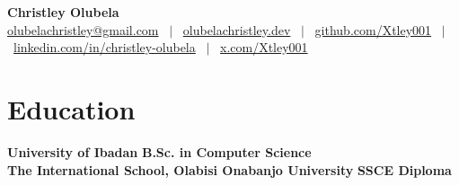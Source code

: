 \documentclass[10pt,a4paper]{article}
\begin{document}
\pagestyle{empty}

\begin{center}
    {\LARGE \textbf{Christley Olubela}} \\[5pt]
    \href{mailto:olubelachristley@gmail.com}{olubelachristley@gmail.com} \ $|$ \ 
    \href{https://www.olubelachristley.dev}{olubelachristley.dev} \ $|$ \ 
    \href{https://github.com/Xtley001}{github.com/Xtley001} \ $|$ \ 
    \href{https://linkedin.com/in/christley-olubela}{linkedin.com/in/christley-olubela} \ $|$ \ 
    \href{https://x.com/Xtley001}{x.com/Xtley001}
\end{center}
\vspace{2pt}

\section{Education}
\textbf{University of Ibadan} \hfill \textbf{B.Sc. in Computer Science} \\[1pt]
\textbf{The International School, Olabisi Onabanjo University} \hfill \textbf{SSCE Diploma}

\end{document}
